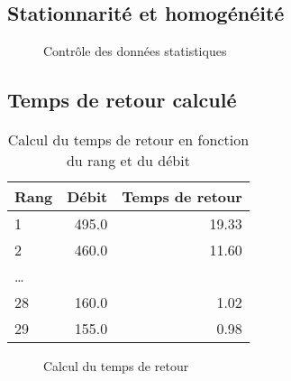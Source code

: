 \subsection{Stationnarité et homogénéité}
\begin{figure}[H]
    \centering
    \caption{Contrôle des données statistiques}
    \label{graph:controleData}
\end{figure}

\subsection{Temps de retour calculé}
\begin{table}[H]
    \centering
    \begin{tabular}{l|r|r}
        \toprule
        \textbf{Rang} & \textbf{Débit} & \textbf{Temps de retour} \\
        \midrule
        1             &          495.0 &                    19.33 \\
        2             &          460.0 &                    11.60 \\
        \dots         &                &                          \\
        28            &          160.0 &                     1.02 \\
        29            &          155.0 &                     0.98 \\
        \bottomrule
    \end{tabular}
    \caption{Calcul du temps de retour en fonction du rang et du débit}
    \label{tab:calcul_tempsRetour}
\end{table}

\begin{figure}[H]
    \centering
    \resizebox*{0.50\textwidth}{!}{
        
    }
    \caption{Calcul du temps de retour}
    \label{graph:calcul_tempsRetour}
\end{figure}

